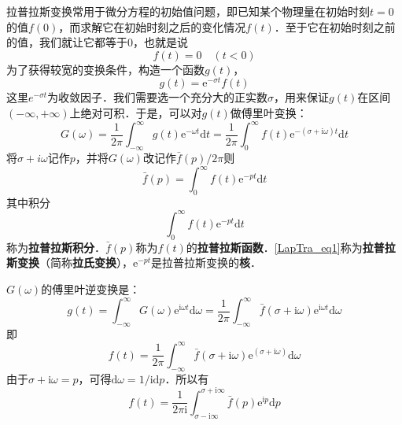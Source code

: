
拉普拉斯变换常用于微分方程的初始值问题，即已知某个物理量在初始时刻$t=0$的值$f(0)$，而求解它在初始时刻之后的变化情况$f(t)$．至于它在初始时刻之前的值，我们就让它都等于$0$，也就是说
\begin{equation}
f(t)=0 \quad(t<0)
\end{equation}
为了获得较宽的变换条件，构造一个函数$g(t)$，
\begin{equation}
g(t)=\mathrm{e}^{-\sigma t} f(t)
\end{equation}
这里$e^{-\sigma t}$为收敛因子．我们需要选一个充分大的正实数$\sigma$，用来保证$g(t) $在区间$(-\infty,+\infty)$上绝对可积．于是，可以对$g(t) $做傅里叶变换：
\begin{equation}
G(\omega)=\frac{1}{2 \pi} \int_{-\infty}^{\infty} g(t) \mathrm{e}^{-\omega t} \mathrm{d} t=\frac{1}{2 \pi} \int_{0}^{\infty} f(t) \mathrm{e}^{-(\sigma+\mathrm{i} \omega) t} \mathrm{d} t
\end{equation}
将$\sigma+i \omega$记作$p$，并将$G(\omega)$改记作$\bar f(p) / 2 \pi$则
\begin{equation} \label{LapTra_eq1}
\bar{f}(p)=\int_{0}^{\infty} f(t) \mathrm{e}^{-p t} \mathrm{d} t
\end{equation}
其中积分
\begin{equation}
\int_{0}^{\infty} f(t) \mathrm{e}^{-p t} \mathrm{d} t
\end{equation}
称为\textbf{拉普拉斯积分}．$\bar f(p)$称为$f(t)$的\textbf{拉普拉斯函数}．\autoref{LapTra_eq1}称为\textbf{拉普拉斯变换}（简称\textbf{拉氏变换}），$\mathrm e^{-pt}$是拉普拉斯变换的\textbf{核}．

$G(\omega)$的傅里叶逆变换是：
\begin{equation}
g(t)=\int_{-\infty}^{\infty} G(\omega) \mathrm{e}^{\mathrm{i} \omega t} \mathrm{d} \omega=\frac{1}{2 \pi} \int_{-\infty}^{\infty} \bar{f}(\sigma+\mathrm{i} \omega) \mathrm{e}^{\mathrm{i} \omega t} \mathrm{d} \omega
\end{equation}
即
\begin{equation}
f(t)=\frac{1}{2 \pi} \int_{-\infty}^{\infty} \bar{f}(\sigma+\mathrm{i} \omega) \mathrm{e}^{(\sigma+\mathrm{i} \omega)} \mathrm{d} \omega
\end{equation}
由于$\sigma+\mathrm i\omega=p$，可得$\mathrm d\omega = 1/\mathrm i\mathrm dp$．所以有
\begin{equation}
f(t)=\frac{1}{2 \pi \mathrm{i}} \int_{\sigma-\mathrm{i} \infty}^{\sigma+\mathrm{i} \infty} \bar{f}(p) \mathrm{e}^{\mathrm{i} p} \mathrm{d} p
\end{equation}

